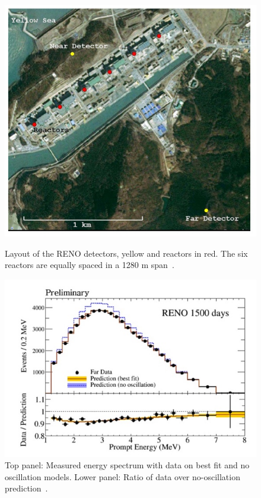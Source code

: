 \begin{figure}[h!]
  \centering
  \begin{minipage}[b]{0.49\textwidth}
    \includegraphics[width=\textwidth]{figures/reno1.jpeg}
    \vspace{2mm}
    \caption{Layout of the RENO detectors, yellow and reactors in red. The six reactors are equally spaced in a 1280 m span~\cite{125Ahn, 126RENO}.}
    \label{fig:reno1}
  \end{minipage}
  \hfill
  \begin{minipage}[b]{0.49\textwidth}
    \includegraphics[width=\textwidth]{figures/reno2.jpeg}
       \vspace{2mm}
    \caption{Top panel: Measured energy spectrum with data on best fit and no oscillation models. Lower panel: Ratio of data over no-oscillation prediction~\cite{125Ahn, 126RENO}.}
     \label{fig:reno2}
  \end{minipage}
\end{figure}

